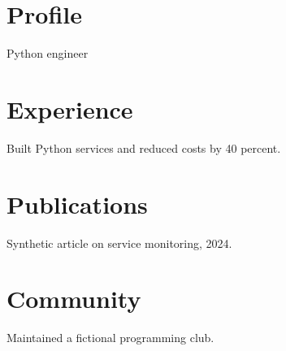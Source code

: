 \documentclass{article}
\begin{document}
\section{Profile}
Python engineer
\section{Experience}
Built Python services and reduced costs by 40 percent.

\section{Publications}
Synthetic article on service monitoring, 2024.
\section{Community}
Maintained a fictional programming club.
\end{document}
